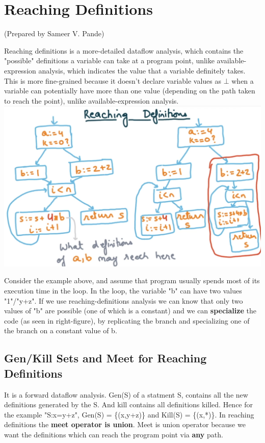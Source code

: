 \section {Reaching Definitions}
\setlength{\parindent}{0pt}
(Prepared by Sameer V. Pande)

Reaching definitions is a more-detailed dataflow analysis, which contains the "possible" definitions a variable can take at a program point, unlike available-expression analysis, which indicates the value that a variable definitely takes.
This is more fine-grained because it doesn't declare variable values as $\bot$ when a variable can potentially have more than one value (depending on the path taken to reach the point), unlike available-expression analysis.
\newline 
\includegraphics[scale=0.3]{images/90_1.png}

Consider the example above, and assume that program usually spends most of its execution time in the loop. In the loop, the variable "b" can have two values "1"/"y+z". If we use reaching-definitions analysis we can know that only two values of "b" are possible (one of which is a constant) and we can \textbf{specialize} the code (as seen in right-figure), by replicating the branch and specializing one of the branch on a constant value of b.

\subsection{Gen/Kill Sets and Meet for Reaching Definitions}
It is a forward dataflow analysis. Gen(S) of a statment S, contains all the new definitions generated by the S. And kill contains all definitions killed.
Hence for the example "S:x=y+z", Gen(S) = \{(x,y+z)\} and Kill(S) = \{(x,*)\}.
\newline
In reaching definitions the \textbf{meet operator is union}. Meet is union operator because we want the definitions which can reach the program point via \textbf{any} path. 

